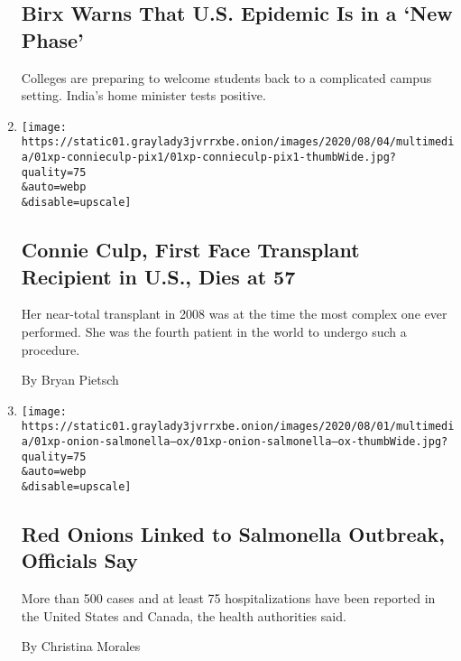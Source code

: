 \begin{enumerate}
  \hypertarget{birx-warns-that-us-epidemic-is-in-a-new-phase}{%
  \subsection{Birx Warns That U.S. Epidemic Is in a `New
  Phase'}\label{birx-warns-that-us-epidemic-is-in-a-new-phase}}

  Colleges are preparing to welcome students back to a complicated
  campus setting. India's home minister tests positive.
\item
  \href{/2020/08/01/us/Connie-culp-dead-face-transplant.html}{}

  \texttt{[image: https://static01.graylady3jvrrxbe.onion/images/2020/08/04/multimedia/01xp-connieculp-pix1/01xp-connieculp-pix1-thumbWide.jpg?quality=75\\\&auto=webp\\\&disable=upscale]}

  \hypertarget{connie-culp-first-face-transplant-recipient-in-us-dies-at-57}{%
  \subsection{Connie Culp, First Face Transplant Recipient in U.S., Dies
  at
  57}\label{connie-culp-first-face-transplant-recipient-in-us-dies-at-57}}

  Her near-total transplant in 2008 was at the time the most complex one
  ever performed. She was the fourth patient in the world to undergo
  such a procedure.

  By Bryan Pietsch
\item
  \href{/2020/08/01/us/salmonella-outbreak-onions.html}{}

  \texttt{[image: https://static01.graylady3jvrrxbe.onion/images/2020/08/01/multimedia/01xp-onion-salmonella--ox/01xp-onion-salmonella--ox-thumbWide.jpg?quality=75\\\&auto=webp\\\&disable=upscale]}

  \hypertarget{red-onions-linked-to-salmonella-outbreak-officials-say}{%
  \subsection{Red Onions Linked to Salmonella Outbreak, Officials
  Say}\label{red-onions-linked-to-salmonella-outbreak-officials-say}}

  More than 500 cases and at least 75 hospitalizations have been
  reported in the United States and Canada, the health authorities said.

  By Christina Morales
\end{enumerate}

